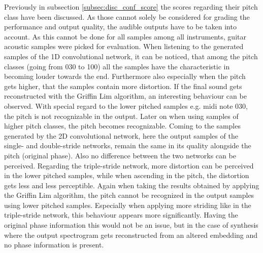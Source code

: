 Previously in subsection \ref{subsec:disc_conf_score} the scores regarding their pitch class have been discussed. As those cannot solely be considered for grading the performance and output quality, the audible outputs have to be taken into account. As this cannot be done for all samples among all instruments, guitar acoustic samples were picked for evaluation. When listening to the generated samples of the 1D convolutional network, it can be noticed, that among the pitch classes (going from 030 to 100) all the samples have the characteristic in becoming louder towards the end. Furthermore also especially when the pitch gets higher, that the samples contain more distortion. If the final sound gets reconstructed with the Griffin Lim algorithm, an interesting behaviour can be observed. With special regard to the lower pitched samples e.g. midi note 030, the pitch is not recognizable in the output. Later on when using samples of higher pitch classes, the pitch becomes recognizable. 
Coming to the samples generated by the 2D convolutional network, here the output samples of the single- and double-stride networks, remain the same in its quality alongside the pitch (original phase). Also no difference between the two networks can be perceived. Regarding the triple-stride network, more distortion can be perceived in the lower pitched samples, while when ascending in the pitch, the distortion gets less and less perceptible. Again when taking the results obtained by applying the Griffin Lim algorithm, the pitch cannot be recognized in the output samples using lower pitched samples. Especially when applying more striding like in the triple-stride network, this behaviour appears more significantly. Having the original phase information this would not be an issue, but in the case of synthesis where the output spectrogram gets reconstructed from an altered embedding and no phase information is present. 

